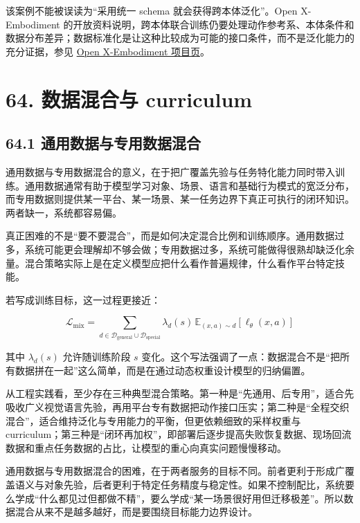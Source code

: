 该案例不能被误读为“采用统一 schema 就会获得跨本体泛化”。Open X-Embodiment 的开放资料说明，跨本体联合训练仍要处理动作参考系、本体条件和数据分布差异；数据标准化是让这种比较成为可能的接口条件，而不是泛化能力的充分证据，参见 \href{https://robotic-transformer-x.github.io/}{Open X-Embodiment 项目页}。

\chapter*{64. 数据混合与 curriculum}

\section*{64.1 通用数据与专用数据混合}


通用数据与专用数据混合的意义，在于把广覆盖先验与任务特化能力同时带入训练。通用数据通常有助于模型学习对象、场景、语言和基础行为模式的宽泛分布，而专用数据则提供某一平台、某一场景、某一任务边界下真正可执行的闭环知识。两者缺一，系统都容易偏。

真正困难的不是“要不要混合”，而是如何决定混合比例和训练顺序。通用数据过多，系统可能更会理解却不够会做；专用数据过多，系统可能做得很熟却缺泛化余量。混合策略实际上是在定义模型应把什么看作普遍规律，什么看作平台特定技能。

若写成训练目标，这一过程更接近：

\begingroup
\scriptsize
\begin{equation*}
\mathcal{L}_{\text{mix}} = \sum_{d \in \mathcal{D}_{\text{general}} \cup \mathcal{D}_{\text{special}}} \lambda_d(s)\,\mathbb{E}_{(x,a)\sim d}[\ell_\theta(x,a)]
\end{equation*}
\endgroup

其中 \(\lambda_d(s)\) 允许随训练阶段 \(s\) 变化。这个写法强调了一点：数据混合不是“把所有数据拼在一起”这么简单，而是在通过动态权重设计模型的归纳偏置。

从工程实践看，至少存在三种典型混合策略。第一种是“先通用、后专用”，适合先吸收广义视觉语言先验，再用平台专有数据把动作接口压实；第二种是“全程交织混合”，适合维持泛化与专用能力的平衡，但更依赖细致的采样权重与 curriculum；第三种是“闭环再加权”，即部署后逐步提高失败恢复数据、现场回流数据和重点任务数据的占比，让模型的重心向真实问题慢慢移动。

通用数据与专用数据混合的困难，在于两者服务的目标不同。前者更利于形成广覆盖语义与对象先验，后者更利于特定任务精度与稳定性。如果不控制配比，系统要么学成“什么都见过但都做不精”，要么学成“某一场景很好用但迁移极差”。所以数据混合从来不是越多越好，而是要围绕目标能力边界设计。


